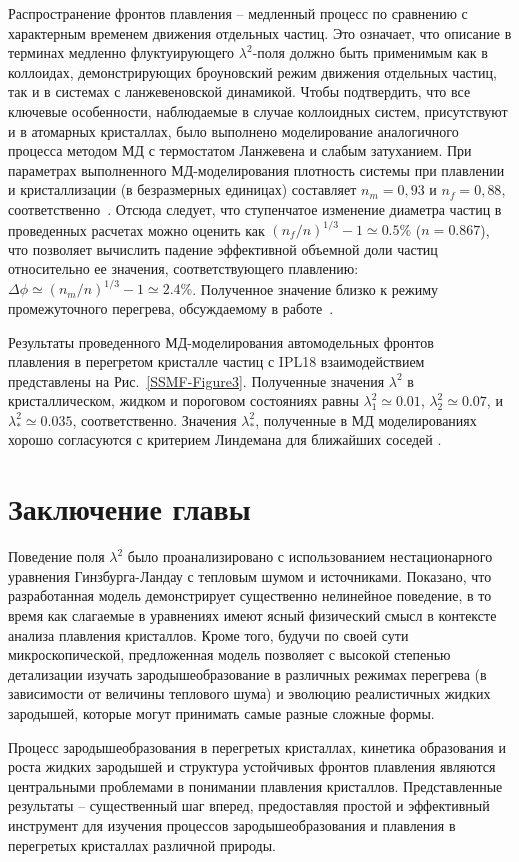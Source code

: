 Распространение фронтов плавления -- медленный процесс по сравнению с характерным временем движения отдельных частиц.
Это означает, что описание в терминах медленно флуктуирующего $\lambda^2$-поля должно быть применимым как в коллоидах, демонстрирующих броуновский режим движения отдельных частиц, так и в системах с ланжевеновской динамикой.
Чтобы подтвердить, что все ключевые особенности, наблюдаемые в случае коллоидных систем, присутствуют и в атомарных кристаллах, было выполнено моделирование аналогичного процесса методом МД с термостатом Ланжевена и слабым затуханием.
При параметрах выполненного МД-моделирования плотность системы при плавлении и кристаллизации (в безразмерных единицах) составляет $ n_m = 0,93 $ и $ n_f = 0,88 $, соответственно~\cite{10.1080/00268979500100911}.
Отсюда следует, что ступенчатое изменение диаметра частиц в проведенных расчетах можно оценить как $ (n_f / n) ^ {1/3} -1 \simeq 0.5 \% $ ($ n = 0.867 $), что позволяет вычислить падение эффективной объемной доли частиц относительно ее значения, соответствующего плавлению:
$\Delta \phi  \simeq (n_m/n)^{1/3}-1\simeq 2.4\%$.
Полученное значение близко к режиму промежуточного перегрева, обсуждаемому в работе~\cite{10.1038/ncomms7942}.


Результаты проведенного МД-моделирования автомодельных фронтов \\ плавления в перегретом кристалле частиц с IPL18 взаимодействием представлены на Рис.~\ref{SSMF-Figure3}.
Полученные значения $\lambda^2$ в кристаллическом, жидком и пороговом состояниях равны $\lambda_1^2 \simeq 0.01$, $\lambda_2^2 \simeq 0.07$, и $\lambda_\ast^2 \simeq 0.035$, соответственно.
Значения $\lambda_\ast^2$, полученные в МД моделированиях хорошо согласуются с критерием Линдемана для ближайших соседей \cite{10.1016/0375-9601(85)90617-6}.


\section{Заключение главы}

Поведение поля $\lambda^2$ было проанализировано с использованием нестационарного уравнения Гинзбурга-Ландау с тепловым шумом и источниками.
Показано, что разработанная модель демонстрирует существенно нелинейное поведение, в то время как слагаемые в уравнениях имеют ясный физический смысл в контексте анализа плавления кристаллов.
Кроме того, будучи по своей сути микроскопической, предложенная модель позволяет с высокой степенью детализации изучать зародышеобразование в различных режимах перегрева (в зависимости от величины теплового шума) и эволюцию реалистичных жидких зародышей, которые могут принимать самые разные сложные формы.

Процесс зародышеобразования в перегретых кристаллах, кинетика образования и роста жидких зародышей и структура устойчивых фронтов плавления являются центральными проблемами в понимании плавления кристаллов.
Представленные результаты -- существенный шаг вперед, предоставляя простой и эффективный инструмент для изучения процессов зародышеобразования и плавления в перегретых кристаллах различной природы.

